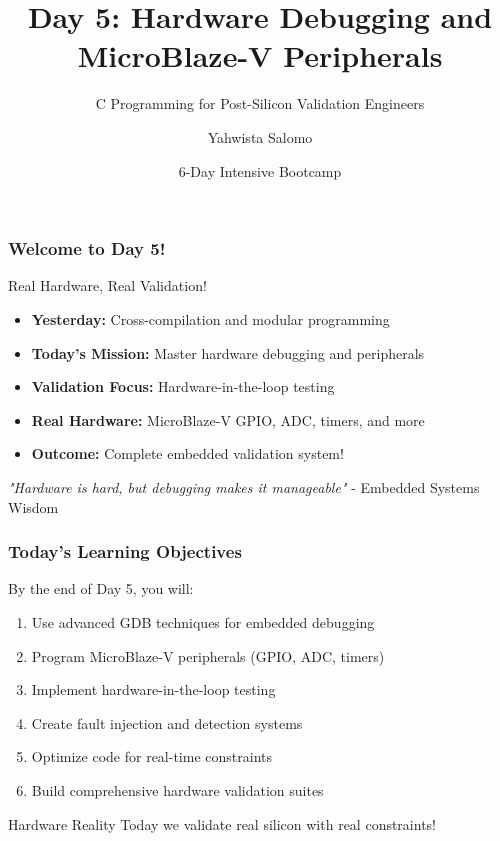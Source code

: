 \documentclass{beamer}
\title{Day 5: Hardware Debugging and MicroBlaze-V Peripherals}
\subtitle{C Programming for Post-Silicon Validation Engineers}
\author{Yahwista Salomo}
\date{6-Day Intensive Bootcamp}
\institute{Post-Silicon Validation Training Program}
\begin{document}
\frame{\titlepage}

\begin{frame}
\frametitle{Welcome to Day 5!}
\begin{center}
\Large Real Hardware, Real Validation!
\end{center}

\begin{itemize}
    \item \textbf{Yesterday:} Cross-compilation and modular programming
    \item \textbf{Today's Mission:} Master hardware debugging and peripherals
    \item \textbf{Validation Focus:} Hardware-in-the-loop testing
    \item \textbf{Real Hardware:} MicroBlaze-V GPIO, ADC, timers, and more
    \item \textbf{Outcome:} Complete embedded validation system!
\end{itemize}

\vspace{0.5cm}
\begin{center}
\textit{"Hardware is hard, but debugging makes it manageable"} - Embedded Systems Wisdom
\end{center}
\end{frame}

\begin{frame}
\frametitle{Today's Learning Objectives}
By the end of Day 5, you will:

\begin{enumerate}
    \item Use advanced GDB techniques for embedded debugging
    \item Program MicroBlaze-V peripherals (GPIO, ADC, timers)
    \item Implement hardware-in-the-loop testing
    \item Create fault injection and detection systems
    \item Optimize code for real-time constraints
    \item Build comprehensive hardware validation suites
\end{enumerate}

\vspace{0.5cm}
\begin{alertblock}{Hardware Reality}
Today we validate real silicon with real constraints!
\end{alertblock}
\end{frame}
\end{document}
